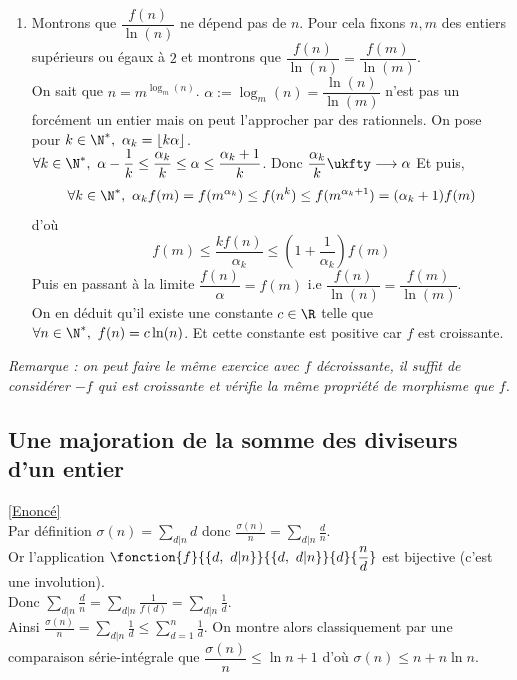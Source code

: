 \documentclass[8pt]{book}
\begin{document}
\begin{enumerate}[leftmargin=*]
		\item Montrons que $\dfrac{f(n)}{\ln(n)}$ ne dépend pas de $n$. Pour cela fixons $n,m$ des entiers supérieurs ou égaux à $2$ et montrons que $\dfrac{f(n)}{\ln(n)}=\dfrac{f(m)}{\ln(m)}$.\\
		On sait que $n=m^{\log_m(n)}$. $\alpha:=\log_m(n)=\dfrac{\ln(n)}{\ln(m)}$ n'est pas un forcément un entier mais on peut l'approcher par des rationnels. On pose pour $k\in \N^*,\ \alpha_k=\lfloor k\alpha\rfloor$.\\
		$\forall k\in \N^*,\ \alpha-\dfrac{1}{k}\leq \dfrac{\alpha_k}{k}\leq \alpha\leq \dfrac{\alpha_k+1}{k}$. Donc $\dfrac{\alpha_k}{k}\ukfty\longrightarrow\alpha$ Et puis, $$\forall k\in \N^*,\ \alpha_kf(m)=f(m^{\alpha_k})\leq f(n^k)\leq f(m^{\alpha_k+1})=(\alpha_k+1)f(m)$$
		d'où
		$$f(m)\leq \dfrac{kf(n)}{\alpha_k}\leq \left(1+\dfrac{1}{\alpha_k}\right)f(m)$$
		Puis en passant à la limite $\dfrac{f(n)}{\alpha}=f(m)$ i.e $\dfrac{f(n)}{\ln(n)}=\dfrac{f(m)}{\ln(m)}$.\\
		On en déduit qu'il existe une constante $c\in \R$ telle que $\forall n\in \N^*,\ f(n)=c\ln(n)$. Et cette constante est positive car $f$ est croissante.
	\end{enumerate}
	\textit{Remarque : on peut faire le même exercice avec $f$ décroissante, il suffit de considérer $-f$ qui est croissante et vérifie la même propriété de morphisme que $f$.}
	
	\subsection{Une majoration de la somme des diviseurs d'un entier }
	\label{Une majoration de la somme des diviseurs d'un entier corrigé}
	\textcolor{blue}{\hyperref[Une majoration de la somme des diviseurs d'un entier]{[Enoncé]}}\\
	Par définition $\sigma(n)=\displaystyle\sum_{d|n}d$ donc $\displaystyle\frac{\sigma(n)}{n}=\sum_{d|n}\frac{d}{n}$.\\
	Or l'application $\fonction{f}{\{d,\ d|n\}}{\{d,\ d|n\}}{d}{\dfrac{n}{d}}$ est bijective (c'est une involution).\\
	Donc $\displaystyle\sum_{d|n}\frac{d}{n}=\sum_{d|n}\frac{1}{f(d)}=\sum_{d|n}\frac{1}{d}$.\\
	Ainsi $\displaystyle\frac{\sigma(n)}{n}=\sum_{d|n}\frac{1}{d}\leq \sum_{d=1}^n\frac{1}{d}$. On montre alors classiquement par une comparaison série-intégrale que $\dfrac{\sigma(n)}{n}\leq \ln n+1$ d'où $\sigma(n)\leq n+n\ln n$.
	
\end{document}
